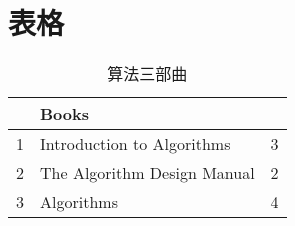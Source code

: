 \chapter{表格}

\begin{table}[!hbtp]
\centering
\begin{tabular}{|c|l|r|}
\hline
    & Books                         &     \\ \hline
1   & Introduction to Algorithms    & 3 \\
2   & The Algorithm Design Manual   & 2 \\
3   & Algorithms                    & 4 \\
\hline
\end{tabular}
\caption{算法三部曲}
\label{tab:trilogy}
\end{table}